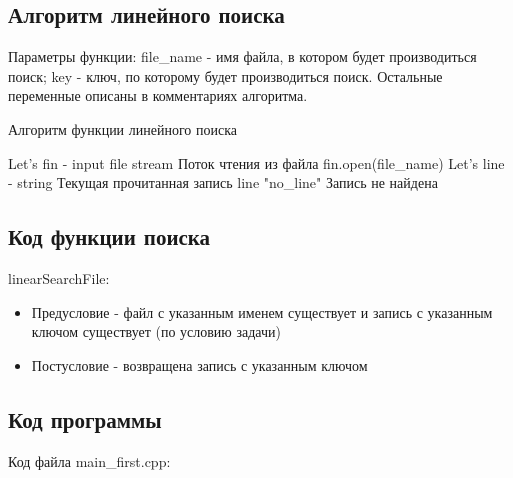 \documentclass[a4paper, 14pt]{extarticle}
\begin{document}
\subsection{Алгоритм линейного поиска}
Параметры функции: file\_name - имя файла, в котором будет производиться
поиск; key - ключ, по которому будет производиться поиск.
Остальные переменные описаны в комментариях алгоритма.
\begin{algorithm}
  \caption{Алгоритм функции линейного поиска}
  \label{alg:linear_search_algo}
  \begin{algorithmic}
    \State Let's fin - input file stream \Comment Поток чтения из файла
    \State fin.open(file\_name)
    \State Let's line - string \Comment Текущая прочитанная запись
    \State \Return line
    \EndIf
    \EndWhile
    \State \Return "no\_line" \Comment Запись не найдена
    \EndFunction
  \end{algorithmic}
\end{algorithm}
\subsection{Код функции поиска}
linearSearchFile:
\begin{itemize}
  \item Предусловие - файл с указанным именем существует и запись с указанным
    ключом существует (по условию задачи)
  \item Постусловие - возвращена запись с указанным ключом 
\end{itemize}

\subsection{Код программы}
Код файла main\_first.cpp:

\end{document}
